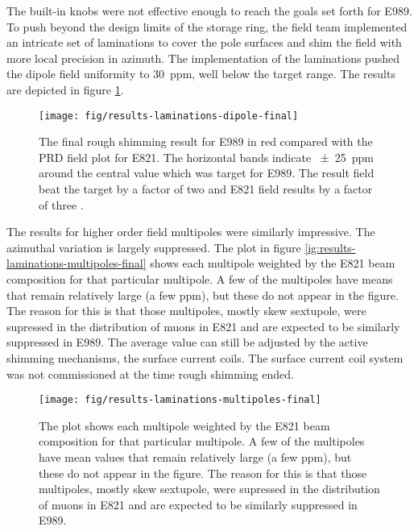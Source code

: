 The built-in knobs were not effective enough to reach the goals set forth for E989.  To push beyond the design limits of the \gmtwo storage ring, the field team implemented an intricate set of laminations to cover the pole surfaces and shim the field with more local precision in azimuth.  The implementation of the laminations pushed the dipole field uniformity to \SI{30}{ppm}, well below the target range.  The results are depicted in figure \ref{fig:results-laminations-dipole-final}.

\begin{figure}
\label{fig:results-laminations-dipole-final}
\texttt{[image: fig/results-laminations-dipole-final]}
\caption{The final rough shimming result for E989 in red compared with the PRD field plot for E821.  The horizontal bands indicate \SI{\pm 25}{ppm} around the central value which was target for E989.  The result field beat the target by a factor of two and E821 field results by a factor of three .}
\end{figure}

The results for higher order field multipoles were similarly impressive.  The azimuthal variation is largely suppressed.  The plot in figure \ref{ig:results-laminations-multipoles-final} shows each multipole weighted by the E821 beam composition for that particular multipole.  A few of the multipoles have means that remain relatively large (a few ppm), but these do not appear in the figure.  The reason for this is that those multipoles, mostly skew sextupole, were supressed in the distribution of muons in E821 and are expected to be similarly suppressed in E989.  The average value can still be adjusted by the active shimming mechanisms, the surface current coils.  The surface current coil system was not commissioned at the time rough shimming ended.

\begin{figure}
\label{fig:results-laminations-multipoles-final}
\texttt{[image: fig/results-laminations-multipoles-final]}
\caption{The plot shows each multipole weighted by the E821 beam composition for that particular multipole.  A few of the multipoles have mean values that remain relatively large (a few ppm), but these do not appear in the figure.  The reason for this is that those multipoles, mostly skew sextupole, were supressed in the distribution of muons in E821 and are expected to be similarly suppressed in E989.}
\end{figure}
